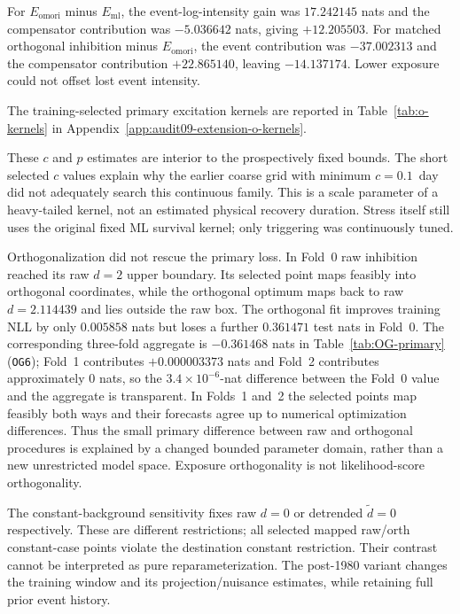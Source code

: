 For $E_{\mathrm{omori}}$ minus $E_{\mathrm{ml}}$, the event-log-intensity gain was $17.242145$ nats and the compensator contribution was $-5.036642$ nats, giving $+12.205503$. For matched orthogonal inhibition minus $E_{\mathrm{omori}}$, the event contribution was $-37.002313$ and the compensator contribution $+22.865140$, leaving $-14.137174$. Lower exposure could not offset lost event intensity.

The training-selected primary excitation kernels are reported in Table~\ref{tab:o-kernels} in Appendix~\ref{app:audit09-extension-o-kernels}.


These $c$ and $p$ estimates are interior to the prospectively fixed bounds. The short selected $c$ values explain why the earlier coarse grid with minimum $c=0.1$~day did not adequately search this continuous family. This is a scale parameter of a heavy-tailed kernel, not an estimated physical recovery duration. Stress itself still uses the original fixed ML survival kernel; only triggering was continuously tuned.

Orthogonalization did not rescue the primary loss. In Fold~0 raw inhibition reached its raw $d=2$ upper boundary. Its selected point maps feasibly into orthogonal coordinates, while the orthogonal optimum maps back to raw $d=2.114439$ and lies outside the raw box. The orthogonal fit improves training NLL by only $0.005858$ nats but loses a further $0.361471$ test nats in Fold~0. The corresponding three-fold aggregate is $-0.361468$ nats in Table~\ref{tab:OG-primary} (\texttt{OG6}); Fold~1 contributes $+0.000003373$ nats and Fold~2 contributes approximately $0$ nats, so the $3.4\times10^{-6}$-nat difference between the Fold~0 value and the aggregate is transparent. In Folds~1 and~2 the selected points map feasibly both ways and their forecasts agree up to numerical optimization differences. Thus the small primary difference between raw and orthogonal procedures is explained by a changed bounded parameter domain, rather than a new unrestricted model space. Exposure orthogonality is not likelihood-score orthogonality.

The constant-background sensitivity fixes raw $d=0$ or detrended $\widetilde d=0$ respectively. These are different restrictions; all selected mapped raw/orth constant-case points violate the destination constant restriction. Their contrast cannot be interpreted as pure reparameterization. The post-1980 variant changes the training window and its projection/nuisance estimates, while retaining full prior event history.



